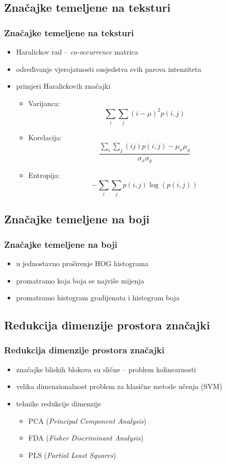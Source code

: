 \documentclass{beamer}
\begin{document}
\subsection{Značajke temeljene na teksturi}
\begin{frame}
\frametitle{Značajke temeljene na teksturi}
\begin{itemize}
\item Haralickov rad \cite{Haralick} -- \emph{co-occurrence} matrica
\item određivanje vjerojatnosti susjedstva svih parova intenziteta
\item primjeri Haralickovih značajki 
\begin{itemize}
\item Varijanca: $$\sum_{i}\sum_{j}(i - \mu)^2p(i, j)$$
\item Korelacija: $$\frac{\sum_{i}\sum_{j}(ij)p(i,j) - \mu_{x}\mu_{y}}{\sigma_{x}\sigma_{y}}$$
\item Entropija: $$-\sum_{i}\sum_{j}p(i, j)\log(p(i, j))$$
\end{itemize}
\end{itemize}
\end{frame}

\subsection{Značajke temeljene na boji}
\begin{frame}
\frametitle{Značajke temeljene na boji}
\begin{itemize}
\item u \cite{Schwartz} jednostavno proširenje HOG histograma
\item promatramo koja boja se najviše mijenja
\item promatramo histogram gradijenata i histogram boja
\end{itemize}
\end{frame}

\subsection{Redukcija dimenzije prostora značajki}
\begin{frame}
\frametitle{Redukcija dimenzije prostora značajki}
\begin{itemize}
\item značajke bliskih blokova su slične -- problem kolinearnosti
\item velika dimenzionalnost problem za klasične metode učenja (SVM)
\item tehnike redukcije dimenzije
\begin{itemize}
\item PCA (\emph{Principal Component Analysis}) 
\item FDA (\emph{Fisher Discriminant Analysis})
\item PLS (\emph{Partial Least Squares})
\end{itemize}
\end{itemize}
\end{frame}
\end{document}
